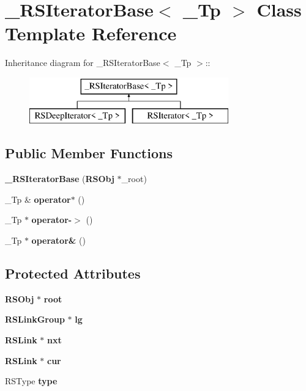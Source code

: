 \section{\_\-RSIteratorBase$<$ \_\-Tp $>$ Class Template Reference}
\label{class__RSIteratorBase}
Inheritance diagram for \_\-RSIteratorBase$<$ \_\-Tp $>$::\begin{figure}[H]
\begin{center}
\leavevmode
\includegraphics[height=2cm]{class__RSIteratorBase}
\end{center}
\end{figure}
\subsection*{Public Member Functions}
\begin{DoxyCompactItemize}
\item 
{\bfseries \_\-RSIteratorBase} ({\bf RSObj} $\ast$\_\-root)\label{class__RSIteratorBase_af07a7397181c549e9dccda2f1ed00ffa}

\item 
\_\-Tp \& {\bfseries operator$\ast$} ()\label{class__RSIteratorBase_ab2c8eb9b01dca6f47d8229cb797b6ead}

\item 
\_\-Tp $\ast$ {\bfseries operator-\/$>$} ()\label{class__RSIteratorBase_a84c8d55b3d349d466c7b3113e8a5fc18}

\item 
\_\-Tp $\ast$ {\bfseries operator\&} ()\label{class__RSIteratorBase_ae17fe20d0ec34ab179549c172986c740}

\end{DoxyCompactItemize}
\subsection*{Protected Attributes}
\begin{DoxyCompactItemize}
\item 
{\bf RSObj} $\ast$ {\bfseries root}\label{class__RSIteratorBase_af96f1020e4efafc8106508034a64c69a}

\item 
{\bf RSLinkGroup} $\ast$ {\bfseries lg}\label{class__RSIteratorBase_ad54c4d5423dc09135301671c4cbd24b7}

\item 
{\bf RSLink} $\ast$ {\bfseries nxt}\label{class__RSIteratorBase_a1630611fa3ae296aced716c08721c163}

\item 
{\bf RSLink} $\ast$ {\bfseries cur}\label{class__RSIteratorBase_a061cc072cef6ae5f9c849742e59ce700}

\item 
RSType {\bfseries type}\label{class__RSIteratorBase_a4d1df4dc2b03c6d03310ddc85ca3848b}

\end{DoxyCompactItemize}


